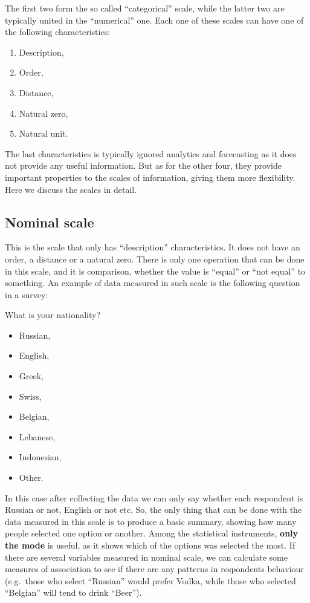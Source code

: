 \documentclass[
]{book}
\providecommand{\tightlist}{%
  \setlength{\itemsep}{0pt}\setlength{\parskip}{0pt}}
\theoremstyle{definition}
\theoremstyle{definition}
\theoremstyle{definition}
\theoremstyle{definition}
\theoremstyle{remark}
\begin{document}
The first two form the so called ``categorical'' scale, while the latter two are typically united in the ``numerical'' one. Each one of these scales can have one of the following characteristics:

\begin{enumerate}
\def\labelenumi{\arabic{enumi}.}
\tightlist
\item
  Description,
\item
  Order,
\item
  Distance,
\item
  Natural zero,
\item
  Natural unit.
\end{enumerate}

The last characteristics is typically ignored analytics and forecasting as it does not provide any useful information. But as for the other four, they provide important properties to the scales of information, giving them more flexibility. Here we discuss the scales in detail.

\hypertarget{nominal-scale}{%
\subsection{Nominal scale}\label{nominal-scale}}

This is the scale that only has ``description'' characteristics. It does not have an order, a distance or a natural zero. There is only one operation that can be done in this scale, and it is comparison, whether the value is ``equal'' or ``not equal'' to something. An example of data measured in such scale is the following question in a survey:

What is your nationality?

\begin{itemize}
\tightlist
\item
  Russian,
\item
  English,
\item
  Greek,
\item
  Swiss,
\item
  Belgian,
\item
  Lebanese,
\item
  Indonesian,
\item
  Other.
\end{itemize}

In this case after collecting the data we can only say whether each respondent is Russian or not, English or not etc. So, the only thing that can be done with the data measured in this scale is to produce a basic summary, showing how many people selected one option or another. Among the statistical instruments, \textbf{only the mode} is useful, as it shows which of the options was selected the most. If there are several variables measured in nominal scale, we can calculate some measures of association to see if there are any patterns in respondents behaviour (e.g.~those who select ``Russian'' would prefer Vodka, while those who selected ``Belgian'' will tend to drink ``Beer'').
\end{document}
